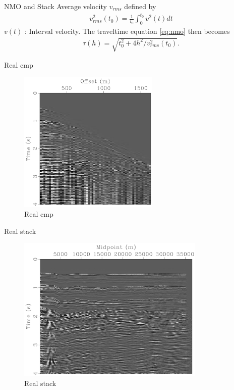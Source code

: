 \documentclass[xcolor=dvipsnames,notes]{beamer}
\begin{document}
\begin{frame}{NMO and Stack}
Average velocity $v_{rms}$ defined by
\begin{eqnarray}
 v^2_{rms}(t_0)=\frac{1}{t_0}\int^{t_0}_0 v^2(t)dt
\label{eq:rms}
\end{eqnarray}
$v(t)$ : Interval velocity.
The traveltime equation \eqref{eq:nmo} then becomes
\begin{eqnarray}
\tau(h)=\sqrt{t^2_0+4h^2/v^2_{rms}(t_0)}.
\label{eq:nmorms}
\end{eqnarray}
\end{frame}
\begin{frame}{Real cmp}
\begin{figure}
  \includegraphics[width=0.6\textwidth]{Fig/cmp.pdf}
  \caption{Real cmp}
  \label{fig:cmp}
\end{figure}
\end{frame}
\begin{frame}{Real stack}
\begin{figure}
  \includegraphics[width=0.8\textwidth]{Fig/stack.pdf}
  \caption{Real stack}
  \label{fig:stack}
\end{figure}
\end{frame}
\end{document}
